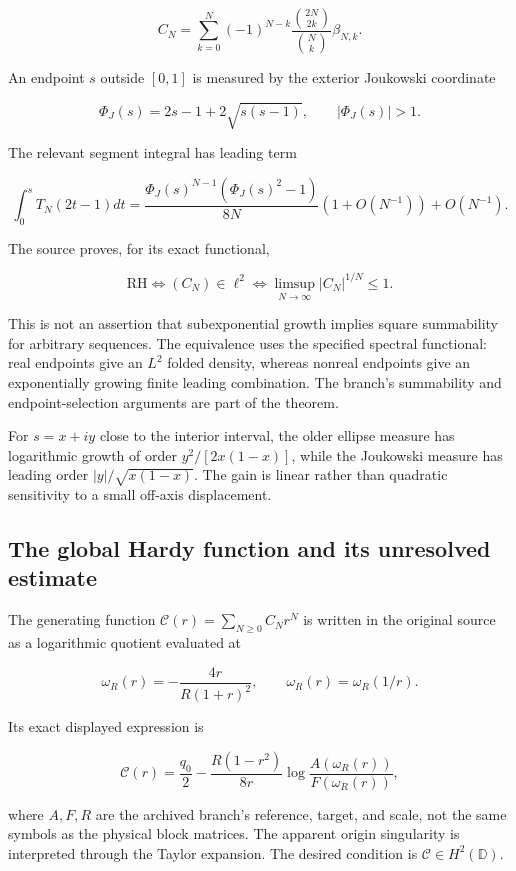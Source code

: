 \documentclass[
  10pt,
  a4paper,
  10pt,
  oneside,
  openany]{book}
\begin{document}
\[
 C_N=\sum_{k=0}^{N}(-1)^{N-k}
 \frac{\binom{2N}{2k}}{\binom Nk}\beta_{N,k}.
 \tag{42.2}\label{eq:42.2}
\]

An endpoint \(s\) outside \([0,1]\) is measured by the exterior
Joukowski coordinate

\[
 \Phi_J(s)=2s-1+2\sqrt{s(s-1)},\qquad |\Phi_J(s)|>1.
\]

The relevant segment integral has leading term

\[
 \int_0^sT_N(2t-1)dt
 =\frac{\Phi_J(s)^{N-1}(\Phi_J(s)^2-1)}{8N}
 (1+O(N^{-1}))+O(N^{-1}).
 \tag{42.3}\label{eq:42.3}
\]

The source proves, for its exact functional,

\[
 \mathrm{RH}\iff(C_N)\in\ell^2
 \iff\limsup_{N\to\infty}|C_N|^{1/N}\le1.
 \tag{42.4}\label{eq:42.4}
\]

This is not an assertion that subexponential growth implies square
summability for arbitrary sequences. The equivalence uses the specified
spectral functional: real endpoints give an \(L^2\) folded density,
whereas nonreal endpoints give an exponentially growing finite leading
combination. The branch's summability and endpoint-selection arguments
are part of the theorem.

For \(s=x+iy\) close to the interior interval, the older ellipse measure
has logarithmic growth of order \(y^2/[2x(1-x)]\), while the Joukowski
measure has leading order \(|y|/\sqrt{x(1-x)}\). The gain is linear
rather than quadratic sensitivity to a small off-axis displacement.

\subsection{The global Hardy function and its unresolved
estimate}\label{the-global-hardy-function-and-its-unresolved-estimate}

The generating function \(\mathscr C(r)=\sum_{N\ge0}C_Nr^N\) is written
in the original source as a logarithmic quotient evaluated at

\[
 \omega_R(r)=-\frac{4r}{R(1+r)^2},\qquad
 \omega_R(r)=\omega_R(1/r).
\]

Its exact displayed expression is

\[
 \mathscr C(r)=\frac{q_0}{2}
 -\frac{R(1-r^2)}{8r}
 \log\frac{A(\omega_R(r))}{F(\omega_R(r))},
 \tag{42.5}\label{eq:42.5}
\]

where \(A,F,R\) are the archived branch's reference, target, and scale,
not the same symbols as the physical block matrices. The apparent origin
singularity is interpreted through the Taylor expansion. The desired
condition is \(\mathscr C\in H^2(\mathbb D)\).
\end{document}
